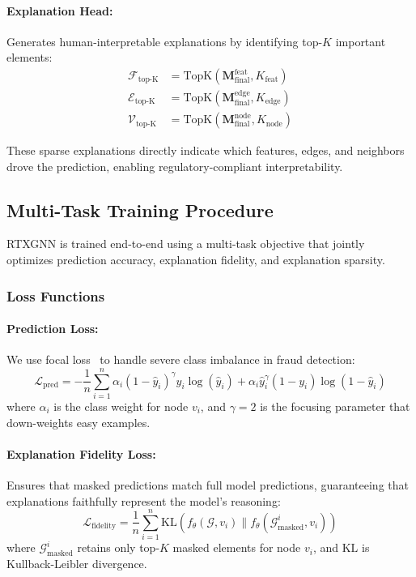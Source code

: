 \paragraph{Explanation Head:} Generates human-interpretable explanations by identifying top-$K$ important elements:
\begin{align}
    \mathcal{F}_{\text{top-K}} &= \text{TopK}(\mathbf{M}^{\text{feat}}_{\text{final}}, K_{\text{feat}}) \\
    \mathcal{E}_{\text{top-K}} &= \text{TopK}(\mathbf{M}^{\text{edge}}_{\text{final}}, K_{\text{edge}}) \\
    \mathcal{V}_{\text{top-K}} &= \text{TopK}(\mathbf{M}^{\text{node}}_{\text{final}}, K_{\text{node}})
\end{align}

These sparse explanations directly indicate which features, edges, and neighbors drove the prediction, enabling regulatory-compliant interpretability.

\subsection{Multi-Task Training Procedure}
\label{subsec:training}

RTXGNN is trained end-to-end using a multi-task objective that jointly optimizes prediction accuracy, explanation fidelity, and explanation sparsity.

\subsubsection{Loss Functions}

\paragraph{Prediction Loss:} We use focal loss~\citep{lin2017focal} to handle severe class imbalance in fraud detection:
\begin{equation}
    \mathcal{L}_{\text{pred}} = -\frac{1}{n} \sum_{i=1}^{n} \alpha_i (1 - \hat{y}_i)^\gamma y_i \log(\hat{y}_i) + \alpha_i \hat{y}_i^\gamma (1 - y_i) \log(1 - \hat{y}_i)
\end{equation}
where $\alpha_i$ is the class weight for node $v_i$, and $\gamma = 2$ is the focusing parameter that down-weights easy examples.

\paragraph{Explanation Fidelity Loss:} Ensures that masked predictions match full model predictions, guaranteeing that explanations faithfully represent the model's reasoning:
\begin{equation}
    \mathcal{L}_{\text{fidelity}} = \frac{1}{n} \sum_{i=1}^{n} \text{KL}\left(f_\theta(\mathcal{G}, v_i) \| f_\theta(\mathcal{G}_{\text{masked}}^i, v_i)\right)
\end{equation}
where $\mathcal{G}_{\text{masked}}^i$ retains only top-$K$ masked elements for node $v_i$, and $\text{KL}$ is Kullback-Leibler divergence.

